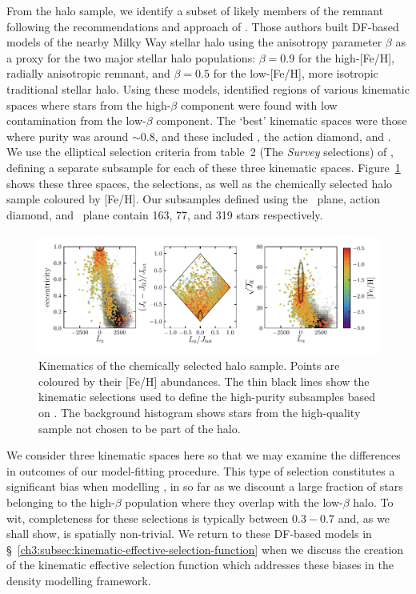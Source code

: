 From the halo sample, we identify a subset of likely members of the \gse remnant following the recommendations and approach of \cite{lane22}. Those authors built DF-based models of the nearby Milky Way stellar halo using the anisotropy parameter $\beta$ as a proxy for the two major stellar halo populations: $\beta=0.9$ for the high-[Fe/H], radially anisotropic \gse remnant, and $\beta=0.5$ for the low-[Fe/H], more isotropic traditional stellar halo. Using these models, \cite{lane22} identified regions of various kinematic spaces where stars from the high-$\beta$ component were found with low contamination from the low-$\beta$ component. The `best' kinematic spaces were those where purity was around $\sim 0.8$, and these included \eLz, the action diamond, and \JRLz. We use the elliptical selection criteria from table~2 (The \textit{Survey} selections) of \cite{lane22}, defining a separate \gse subsample for each of these three kinematic spaces. Figure~\ref{ch3:fig:halo_kinematics} shows these three spaces, the \gse selections, as well as the chemically selected halo sample coloured by [Fe/H]. Our \gse subsamples defined using the \eLz\ plane, action diamond, and \JRLz\ plane contain 163, 77, and 319 stars respectively.

\begin{figure}
    \centering
    \includegraphics[width=\textwidth]{figure/ch3/halo_kinematics.pdf}
    \caption{Kinematics of the chemically selected halo sample. Points are coloured by their [Fe/H] abundances. The thin black lines show the kinematic selections used to define the high-purity \gse subsamples based on \cite{lane22}. The background histogram shows stars from the high-quality sample not chosen to be part of the halo.}
    \label{ch3:fig:halo_kinematics}
\end{figure}

We consider three kinematic spaces here so that we may examine the differences in outcomes of our model-fitting procedure. This type of selection constitutes a significant bias when modelling \gse, in so far as we discount a large fraction of stars belonging to the high-$\beta$ \gse population where they overlap with the low-$\beta$ halo. To wit, completeness for these selections is typically between $0.3-0.7$ and, as we shall show, is spatially non-trivial. We return to these DF-based models in \S~\ref{ch3:subsec:kinematic-effective-selection-function} when we discuss the creation of the kinematic effective selection function which addresses these biases in the density modelling framework.

